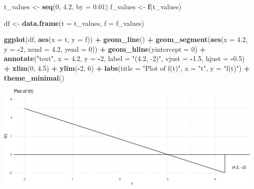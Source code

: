 \documentclass[
]{article}
\newenvironment{Shaded}{\begin{snugshade}}{\end{snugshade}}
\newcommand{\AttributeTok}[1]{\textcolor[rgb]{0.13,0.29,0.53}{#1}}
\newcommand{\DecValTok}[1]{\textcolor[rgb]{0.00,0.00,0.81}{#1}}
\newcommand{\FloatTok}[1]{\textcolor[rgb]{0.00,0.00,0.81}{#1}}
\newcommand{\FunctionTok}[1]{\textcolor[rgb]{0.13,0.29,0.53}{\textbf{#1}}}
\newcommand{\NormalTok}[1]{#1}
\newcommand{\OtherTok}[1]{\textcolor[rgb]{0.56,0.35,0.01}{#1}}
\newcommand{\SpecialCharTok}[1]{\textcolor[rgb]{0.81,0.36,0.00}{\textbf{#1}}}
\newcommand{\StringTok}[1]{\textcolor[rgb]{0.31,0.60,0.02}{#1}}
\begin{document}
\begin{Shaded}
\begin{Highlighting}[]
\NormalTok{t\_values }\OtherTok{\textless{}{-}} \FunctionTok{seq}\NormalTok{(}\DecValTok{0}\NormalTok{, }\FloatTok{4.2}\NormalTok{, }\AttributeTok{by =} \FloatTok{0.01}\NormalTok{)}
\NormalTok{f\_values }\OtherTok{\textless{}{-}} \FunctionTok{f}\NormalTok{(t\_values)}

\NormalTok{df }\OtherTok{\textless{}{-}} \FunctionTok{data.frame}\NormalTok{(}\AttributeTok{t =}\NormalTok{ t\_values, }\AttributeTok{f =}\NormalTok{ f\_values)}

\FunctionTok{ggplot}\NormalTok{(df, }\FunctionTok{aes}\NormalTok{(}\AttributeTok{x =}\NormalTok{ t, }\AttributeTok{y =}\NormalTok{ f)) }\SpecialCharTok{+}
  \FunctionTok{geom\_line}\NormalTok{() }\SpecialCharTok{+}
  \FunctionTok{geom\_segment}\NormalTok{(}\FunctionTok{aes}\NormalTok{(}\AttributeTok{x =} \FloatTok{4.2}\NormalTok{, }\AttributeTok{y =} \SpecialCharTok{{-}}\DecValTok{2}\NormalTok{, }\AttributeTok{xend =} \FloatTok{4.2}\NormalTok{, }\AttributeTok{yend =} \DecValTok{0}\NormalTok{)) }\SpecialCharTok{+} 
  \FunctionTok{geom\_hline}\NormalTok{(}\AttributeTok{yintercept =} \DecValTok{0}\NormalTok{) }\SpecialCharTok{+}  
  \FunctionTok{annotate}\NormalTok{(}\StringTok{"text"}\NormalTok{, }\AttributeTok{x =} \FloatTok{4.2}\NormalTok{, }\AttributeTok{y =} \SpecialCharTok{{-}}\DecValTok{2}\NormalTok{, }\AttributeTok{label =} \StringTok{"(4.2, {-}2)"}\NormalTok{, }\AttributeTok{vjust =} \SpecialCharTok{{-}}\FloatTok{1.5}\NormalTok{, }\AttributeTok{hjust =} \SpecialCharTok{{-}}\FloatTok{0.5}\NormalTok{) }\SpecialCharTok{+}  
  \FunctionTok{xlim}\NormalTok{(}\DecValTok{0}\NormalTok{, }\FloatTok{4.5}\NormalTok{) }\SpecialCharTok{+} 
  \FunctionTok{ylim}\NormalTok{(}\SpecialCharTok{{-}}\DecValTok{2}\NormalTok{, }\DecValTok{6}\NormalTok{) }\SpecialCharTok{+} 
  \FunctionTok{labs}\NormalTok{(}\AttributeTok{title =} \StringTok{"Plot of f(t)"}\NormalTok{, }\AttributeTok{x =} \StringTok{"t"}\NormalTok{, }\AttributeTok{y =} \StringTok{"f(t)"}\NormalTok{) }\SpecialCharTok{+}
  \FunctionTok{theme\_minimal}\NormalTok{()}
\end{Highlighting}
\end{Shaded}

\includegraphics{laplace_transform_files/figure-latex/plot-function-1.pdf}
\end{document}
